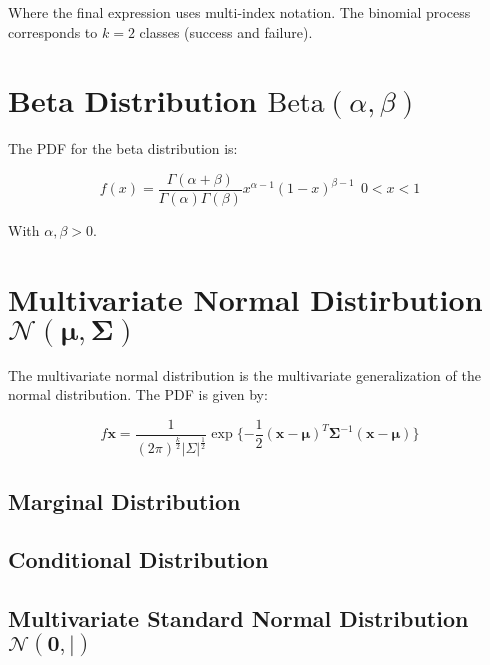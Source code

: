 Where the final expression uses multi-index notation. The binomial process corresponds to $k=2$ classes (success and failure).



\section{Beta Distribution $\mathrm{Beta}(\alpha,\beta)$}

The PDF for the beta distribution is:

\begin{equation}
f(x) = \frac{\Gamma(\alpha + \beta)}{\Gamma(\alpha)\Gamma(\beta)}x^{\alpha-1}(1-x)^{\beta-1}\ \ 0 < x < 1
\end{equation}

With $\alpha, \beta > 0$.


\section{Multivariate Normal Distirbution $\mathscr{N}(\mathbf{\mu},\mathbf{\Sigma})$}
The multivariate normal distribution is the multivariate generalization of the normal distribution. The PDF is given by:

\begin{equation}
f{\mathbf{x}} = \frac{1}{(2\pi)^{\frac{k}{2}}|\Sigma|^{\frac{1}{2}}}\exp\{-\frac{1}{2}(\mathbf{x}-\mathbf{\mu})^T \mathbf{\Sigma}^{-1}(\mathbf{x}-\mathbf{\mu})\}
\end{equation}

\subsection{Marginal Distribution}

\subsection{Conditional Distribution}



\subsection{Multivariate Standard Normal Distribution $\mathscr{N}(\mathbf{0},\mathbf{|})$}